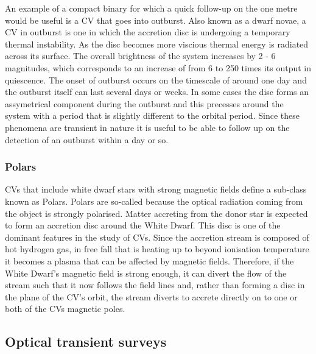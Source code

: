 \documentclass[a4paper,fleqn,usenatbib]{mnras}
\begin{document}
An example of a compact binary for which a quick follow-up on the one metre would be useful is a CV that goes into outburst. Also known as a dwarf novae, a CV in outburst is one in which the accretion disc is undergoing a temporary thermal instability. As the disc becomes more viscious thermal energy is radiated across its surface. The overall brightness of the system increases by 2 - 6 magnitudes, which corresponds to an increase of from 6 to 250 times its output in quiescence.  The onset of outburst occurs on the timescale of around one day and the outburst itself can last several days or weeks. In some cases the disc forms an assymetrical component during the outburst and this precesses around the system with a period that is slightly different to the orbital period. Since these phenomena are transient in nature it is useful to be able to follow up on the detection of an outburst within a day or so. 

\subsubsection{Polars}
CVs that include white dwarf stars with strong magnetic fields define a sub-class known as Polars. Polars are so-called because the optical radiation coming from the object is strongly polarised. Matter accreting from the donor star is expected to form an accretion disc around the White Dwarf. This disc is one of the dominant features in the study of CVs. Since the accretion stream is composed of hot hydrogen gas, in free fall that is heating up to beyond ionisation temperature it becomes a plasma that can be affected by magnetic fields. Therefore, if the White Dwarf's magnetic field is strong enough, it can divert the flow of the stream such that it now follows the field lines and, rather than forming a disc in the plane of the CV's orbit, the stream diverts to accrete directly on to one or both of the CVs magnetic poles. 

\subsection{Optical transient surveys}
\end{document}
